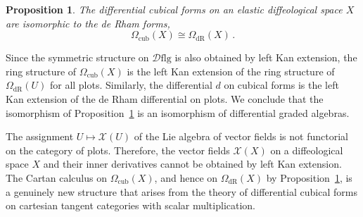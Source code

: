\documentclass[12pt,reqno, a4paper]{amsart}
\numberwithin{equation}{section}
\theoremstyle{plain}
\newtheorem{Proposition}[Theorem]{Proposition}
\theoremstyle{definition}
\theoremstyle{remark}
\newcommand{\calX}{\mathcal{X}}
\newcommand{\Dflg}{{\mathcal{D}\mathrm{flg}}}
\begin{document}
\begin{Proposition}
\label{prop:cubElastic}
The differential cubical forms on an elastic diffeological space $X$ are isomorphic to the de Rham forms,
\begin{equation*}
  \Omega_\mathrm{cub}(X) \cong \Omega_\mathrm{dR}(X)
  \,.
\end{equation*}
\end{Proposition}

Since the symmetric structure on $\Dflg$ is also obtained by left Kan extension, the ring structure of $\Omega_\mathrm{cub}(X)$ is the left Kan extension of the ring structure of $\Omega_\mathrm{dR}(U)$ for all plots. Similarly, the differential $d$ on cubical forms is the left Kan extension of the de Rham differential on plots. We conclude that the isomorphism of Proposition~\ref{prop:cubElastic} is an isomorphism of differential graded algebras.

The assignment $U \mapsto \calX(U)$ of the Lie algebra of vector fields is not functorial on the category of plots. Therefore, the vector fields $\calX(X)$ on a diffeological space $X$ and their inner derivatives cannot be obtained by left Kan extension. The Cartan calculus on $\Omega_\mathrm{cub}(X)$, and hence on $\Omega_\mathrm{dR}(X)$ by Proposition~\ref{prop:cubElastic}, is a genuinely new structure that arises from the theory of differential cubical forms on cartesian tangent categories with scalar multiplication.





\end{document}
